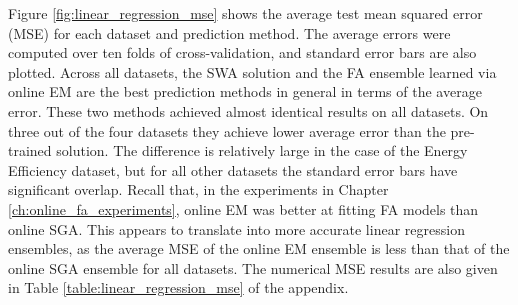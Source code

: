 \documentclass[msc,deptreport.inf]{infthesis} %
\begin{document}
Figure \ref{fig:linear_regression_mse} shows the average test mean squared error (MSE) for each dataset and prediction method. The average errors were computed over ten folds of cross-validation, and standard error bars are also plotted. Across all datasets, the SWA solution and the FA ensemble learned via online EM are the best prediction methods in general in terms of the average error. These two methods achieved almost identical results on all datasets. On three out of the four datasets they achieve lower average error than the pre-trained solution. The difference is relatively large in the case of the Energy Efficiency dataset, but for all other datasets the standard error bars have significant overlap. Recall that, in the experiments in Chapter \ref{ch:online_fa_experiments}, online EM was better at fitting FA models than online SGA. This appears to translate into more accurate linear regression ensembles, as the average MSE of the online EM ensemble is less than that of the online SGA ensemble for all datasets. The numerical MSE results are also given in Table \ref{table:linear_regression_mse} of the appendix. 
\end{document}
